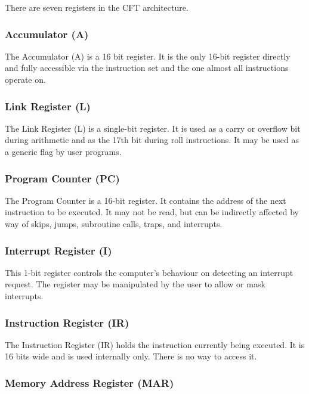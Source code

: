 \documentclass[11pt,a4paper,twocolumns]{article}
\newcommand\register[1]{\textsf{#1}}
\newcommand\A{\register{A}}
\newcommand\Lreg{\register{L}}
\newcommand\Ireg{\register{I}}
\newcommand\MAR{\register{MAR}}
\newcommand\PC{\register{PC}}
\newcommand\IR{\register{IR}}
\begin{document}
There are seven registers in the CFT architecture.

\subsubsection{Accumulator (\A)}

The Accumulator (\A) is a 16 bit register. It is the only 16-bit
register directly and fully accessible via the instruction set and the
one almost all instructions operate on.

\subsubsection{Link Register (\Lreg)}

The Link Register (\Lreg) is a single-bit register. It is used as a carry
or overflow bit during arithmetic and as the 17th bit during roll
instructions. It may be used as a generic flag by user programs.

\subsubsection{Program Counter (\PC)}

The Program Counter is a 16-bit register. It contains the address of
the next instruction to be executed. It may not be read, but can be
indirectly affected by way of skips, jumps, subroutine calls, traps,
and interrupts.

\subsubsection{Interrupt Register (\Ireg)}

This 1-bit register controls the computer's behaviour on detecting an
interrupt request. The register may be manipulated by the user to
allow or mask interrupts.

\subsubsection{Instruction Register (\IR)}

The Instruction Register (\IR) holds the instruction currently being
executed. It is 16 bits wide and is used internally only. There is no
way to access it.

\subsubsection{Memory Address Register (\MAR)}
\end{document}
